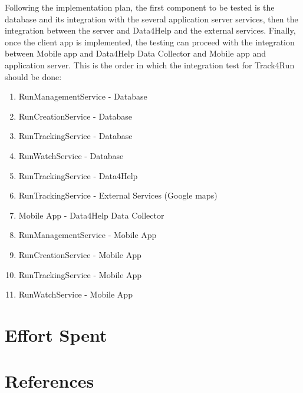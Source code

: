 \documentclass[a4paper]{article}
\begin{document}
\noindent Following the implementation plan, the first component to be tested is the database and its integration with the several application server services, then the integration between the server and Data4Help and the external services.
Finally, once the client app is implemented, the testing can proceed with the integration between Mobile app and Data4Help Data Collector and Mobile app and application server.
\newline\newline This is the order in which the integration test for Track4Run should be done:

\begin{enumerate}[label*=\bf{\arabic*} . ]
    \item RunManagementService - Database
    \item RunCreationService - Database
    \item RunTrackingService - Database
    \item RunWatchService - Database
    \item RunTrackingService - Data4Help
    \item RunTrackingService - External Services (Google maps)
    \item Mobile App - Data4Help Data Collector
    \item RunManagementService - Mobile App
    \item RunCreationService - Mobile App
    \item RunTrackingService - Mobile App
    \item RunWatchService - Mobile App
\end{enumerate}

\clearpage

\section{Effort Spent}

\section{References}
\end{document}
